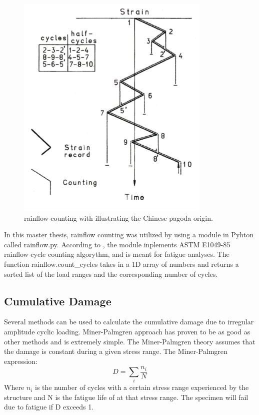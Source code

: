 \begin{figure}[H]
\centering
\includegraphics[scale=0.9]{figures/pagoda}
\caption[$\; \:$rainflow counting]{rainflow counting with illustrating the Chinese pagoda origin.    \cite{fatigue2016} }
 \label{fig:pagoda}
\end{figure}
\noindent In this master thesis, rainflow counting was utilized by using a module in Pyhton called rainflow.py. According to \cite{rf}, the module inplements ASTM E1049-85 rainflow cycle counting
algorythm, and is meant for fatigue analyses. The function rainflow.count\_cycles takes in a 1D array of numbers and returns a sorted list of the load ranges and the corresponding
number of cycles.

\subsection{Cumulative Damage}
Several methods can be used to calculate the cumulative damage due to irregular amplitude cyclic loading. Miner-Palmgren approach has proven to be as good as other methods and is extremely simple. The Miner-Palmgren theory assumes that the damage is constant during a given stress range. The Miner-Palmgren expression:
\begin{equation}
    D=\sum_i \frac{n_i}{N} 
    \label{eq:MP}
\end{equation}
Where $n_i$ is the number of cycles with a certain stress range experienced by the structure and N is the fatigue life of at that stress range.\newline
\newline
The specimen will fail due to fatigue if D exceeds 1.

